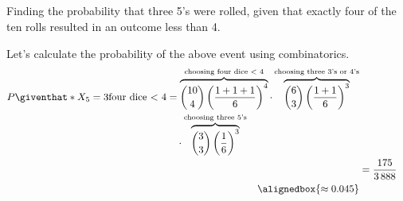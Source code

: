 \documentclass[hwnumber=4,studentnumber=20053722]{mthe353answer}
\begin{document}
\begin{questions}
\begin{parts}
      \part{}
      Finding the probability that three 5's were rolled, given that exactly
      four of the ten rolls resulted in an outcome less than 4.
      \begin{solution}
        Let's calculate the probability of the above event using combinatorics.
        \begin{align*}
          \begin{split}
            P\giventhat*{X_5=3}{\text{four dice \(<\) 4}} &=
            \overbrace{\binom{10}{4}\left(\frac{1+1+1}{6}\right)^4}
              ^{\text{choosing four dice \(<\) 4}} \cdot
            \overbrace{\binom{6}{3}\left(\frac{1+1}{6}\right)^3}
              ^{\text{choosing three 3's or 4's}} \\
            &\quad \cdot \overbrace{\binom{3}{3}\left(\frac{1}{6}\right)^3}
              ^{\text{choosing three 5's}}
          \end{split}\\
          &= \frac{175}{3\,888}\\
          \alignedbox{\approx 0.045}
        \end{align*}
      \end{solution}
    \end{parts}
  \end{questions}
\end{document}
